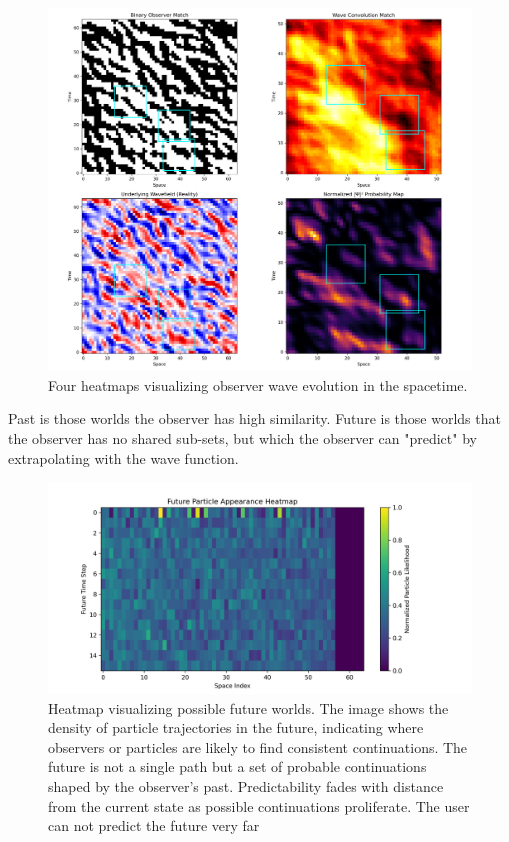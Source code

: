 \documentclass[11pt]{article}
\begin{document}
\begin{figure}[h!]
    \centering
    \includegraphics[width=1.0\textwidth]{figures/observer_wave_evolution.png}
    \caption{Four heatmaps visualizing observer wave evolution in the spacetime. }
    \label{fig:observer_wave_evolution}
\end{figure}

Past is those worlds the observer has high similarity. Future is those worlds that the observer has no shared sub-sets, but which the observer can "predict" by extrapolating with the wave function.

\begin{figure}[h!]
    \centering
    \includegraphics[width=1.0\textwidth]{figures/future_particle_heatmap.png}
    \caption{Heatmap visualizing possible future worlds. The image shows the density of particle trajectories in the future, indicating where observers or particles are likely to find consistent continuations. The future is not a single path but a set of probable continuations shaped by the observer's past. Predictability fades with distance from the current state as possible continuations proliferate. The user can not predict the future very far}
    \label{fig:future_particle_heatmap}
\end{figure}
\end{document}
